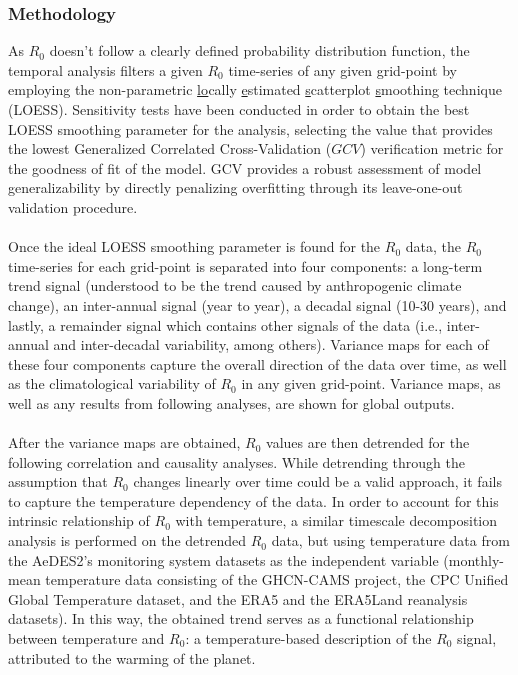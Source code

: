 \documentclass[10pt,twocolumn]{wlscirep}
\begin{document}
\subsubsection{Methodology} \label{sec-methods-1-methodology}

As $R_0$ doesn't follow a clearly defined probability distribution function, the temporal analysis filters a given $R_0$ time-series of any given grid-point by employing the non-parametric \underline{lo}cally \underline{e}stimated \underline{s}catterplot \underline{s}moothing technique (LOESS)\cite{jacoby_2000}. Sensitivity tests have been conducted in order to obtain the best LOESS smoothing parameter for the analysis, selecting the value that provides the lowest Generalized Correlated Cross-Validation ($GCV$) verification metric for the goodness of fit of the model\cite{craven_1978}. GCV provides a robust assessment of model generalizability by directly penalizing overfitting through its leave-one-out validation procedure\cite{marcotte_1995}.
\\
\\
Once the ideal LOESS smoothing parameter is found for the $R_0$ data, the $R_0$ time-series for each grid-point is separated into four components: a long-term trend signal (understood to be the trend caused by anthropogenic climate change), an inter-annual signal (year to year), a decadal signal (10-30 years), and lastly, a remainder signal which contains other signals of the data (i.e., inter-annual and inter-decadal variability, among others). Variance maps for each of these four components capture the overall direction of the data over time, as well as the climatological variability of $R_0$ in any given grid-point. Variance maps, as well as any results from following analyses, are shown for global outputs.
\\
\\
After the variance maps are obtained, $R_0$ values are then detrended for the following correlation and causality analyses. While detrending through the assumption that $R_0$ changes linearly over time could be a valid approach, it fails to capture the temperature dependency of the data. In order to account for this intrinsic relationship of $R_0$ with temperature, a similar timescale decomposition analysis is performed on the detrended $R_0$ data, but using temperature data from the AeDES2's monitoring system datasets as the independent variable (monthly-mean temperature data consisting of the GHCN-CAMS project\cite{fan_2008}, the CPC Unified Global Temperature dataset\cite{xie_2007}, and the ERA5 and the ERA5Land reanalysis datasets\cite{chen_2008}). In this way, the obtained trend serves as a functional relationship between temperature and $R_0$: a temperature-based description of the $R_0$ signal, attributed to the warming of the planet\cite{greene_2011}.
\end{document}

